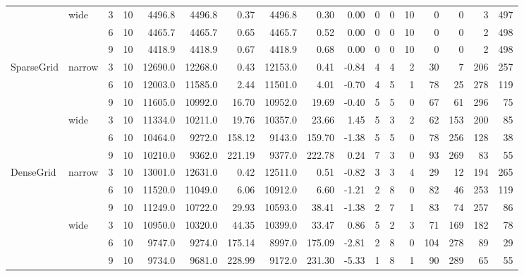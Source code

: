 {\begin{table}[htb]
{\begin{tabular}{lllc|r|rr|rrr|rrr|rrrr}
 & wide & 3 & 10 & 4496.8 & 4496.8 & 0.37 & 4496.8 & 0.30 & 0.00 & 0 & 0 & 10 & 0 & 0 & 3 & 497 \\
 &  & 6 & 10 & 4465.7 & 4465.7 & 0.65 & 4465.7 & 0.52 & 0.00 & 0 & 0 & 10 & 0 & 0 & 2 & 498 \\
 &  & 9 & 10 & 4418.9 & 4418.9 & 0.67 & 4418.9 & 0.68 & 0.00 & 0 & 0 & 10 & 0 & 0 & 2 & 498 \\ \cline{1-17}
SparseGrid & narrow & 3 & 10 & 12690.0 & 12268.0 & 0.43 & 12153.0 & 0.41 & -0.84 & 4 & 4 & 2 & 30 & 7 & 206 & 257 \\
 &  & 6 & 10 & 12003.0 & 11585.0 & 2.44 & 11501.0 & 4.01 & -0.70 & 4 & 5 & 1 & 78 & 25 & 278 & 119 \\
 &  & 9 & 10 & 11605.0 & 10992.0 & 16.70 & 10952.0 & 19.69 & -0.40 & 5 & 5 & 0 & 67 & 61 & 296 & 75 \\ \cline{2-17}
 & wide & 3 & 10 & 11334.0 & 10211.0 & 19.76 & 10357.0 & 23.66 & 1.45 & 5 & 3 & 2 & 62 & 153 & 200 & 85 \\
 &  & 6 & 10 & 10464.0 & 9272.0 & 158.12 & 9143.0 & 159.70 & -1.38 & 5 & 5 & 0 & 78 & 256 & 128 & 38 \\
 &  & 9 & 10 & 10210.0 & 9362.0 & 221.19 & 9377.0 & 222.78 & 0.24 & 7 & 3 & 0 & 93 & 269 & 83 & 55 \\ \cline{1-17}
DenseGrid & narrow & 3 & 10 & 13001.0 & 12631.0 & 0.42 & 12511.0 & 0.51 & -0.82 & 3 & 3 & 4 & 29 & 12 & 194 & 265 \\
 &  & 6 & 10 & 11520.0 & 11049.0 & 6.06 & 10912.0 & 6.60 & -1.21 & 2 & 8 & 0 & 82 & 46 & 253 & 119 \\
 &  & 9 & 10 & 11249.0 & 10722.0 & 29.93 & 10593.0 & 38.41 & -1.38 & 2 & 7 & 1 & 83 & 74 & 257 & 86 \\ \cline{2-17}
 & wide & 3 & 10 & 10950.0 & 10320.0 & 44.35 & 10399.0 & 33.47 & 0.86 & 5 & 2 & 3 & 71 & 169 & 182 & 78 \\
 &  & 6 & 10 & 9747.0 & 9274.0 & 175.14 & 8997.0 & 175.09 & -2.81 & 2 & 8 & 0 & 104 & 278 & 89 & 29 \\
 &  & 9 & 10 & 9734.0 & 9681.0 & 228.99 & 9172.0 & 231.30 & -5.33 & 1 & 8 & 1 & 90 & 289 & 65 & 55 \\ \cline{1-17}
\bottomrule
\end{tabular}
}
\end{table}
}
